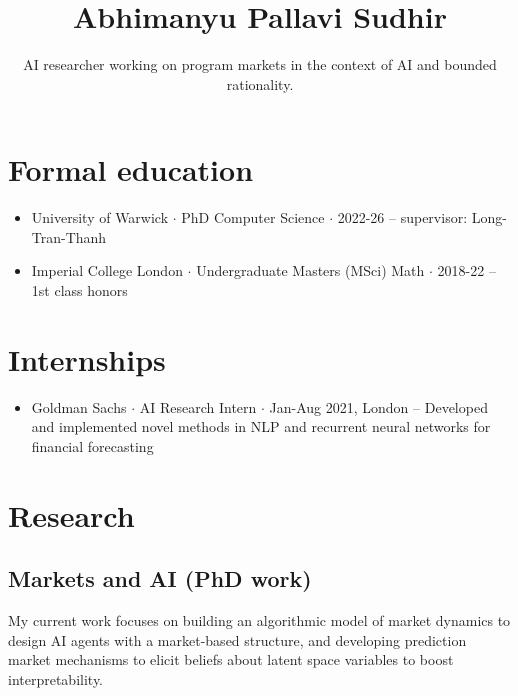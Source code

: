 \documentclass{article}
\title{\Large\bf Abhimanyu Pallavi Sudhir}
\subtitle{AI researcher working on program markets in the context of AI and bounded rationality. \\ %
\vspace{-2em}}
\begin{document}
\begingroup
\let\center\flushleft
\let\endcenter\endflushleft
\maketitle
\endgroup


\section*{Formal education}

\begin{itemize}

    \item University of Warwick $\cdot$ PhD Computer Science $\cdot$ 2022-26 -- supervisor: Long-Tran-Thanh %

    \item Imperial College London $\cdot$ Undergraduate Masters (MSci) Math $\cdot$ 2018-22 -- 1st class honors

\end{itemize}

\section*{Internships}

\begin{itemize}

    \item Goldman Sachs $\cdot$ AI Research Intern $\cdot$ Jan-Aug 2021, London -- Developed and implemented novel methods in NLP and recurrent neural networks for financial forecasting

\end{itemize}

\section*{Research}

\subsection*{Markets and AI (PhD work)}

My current work focuses on building an algorithmic model of market dynamics to design AI agents with a market-based structure, and developing prediction market mechanisms to elicit beliefs about latent space variables to boost interpretability.
\end{document}
